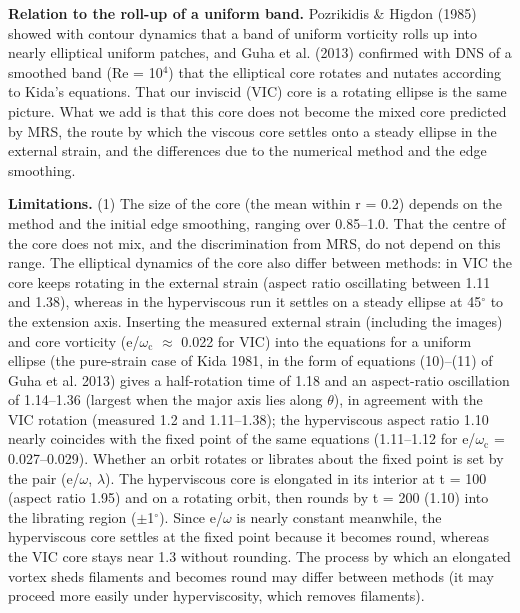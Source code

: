 \documentclass[11pt]{article}
\begin{document}
\textbf{Relation to the roll-up of a uniform band.} Pozrikidis \& Higdon (1985) showed with contour dynamics that a band of uniform vorticity rolls up into nearly elliptical uniform patches, and Guha et al. (2013) confirmed with DNS of a smoothed band (Re = 10$^{4}$) that the elliptical core rotates and nutates according to Kida's equations. That our inviscid (VIC) core is a rotating ellipse is the same picture. What we add is that this core does not become the mixed core predicted by MRS, the route by which the viscous core settles onto a steady ellipse in the external strain, and the differences due to the numerical method and the edge smoothing.

\textbf{Limitations.} (1) The size of the core (the mean within r = 0.2) depends on the method and the initial edge smoothing, ranging over 0.85--1.0. That the centre of the core does not mix, and the discrimination from MRS, do not depend on this range. The elliptical dynamics of the core also differ between methods: in VIC the core keeps rotating in the external strain (aspect ratio oscillating between 1.11 and 1.38), whereas in the hyperviscous run it settles on a steady ellipse at 45$^\circ$ to the extension axis. Inserting the measured external strain (including the images) and core vorticity (e/$\omega{}_{\mathrm{c}}$ $\approx{}$ 0.022 for VIC) into the equations for a uniform ellipse (the pure-strain case of Kida 1981, in the form of equations (10)--(11) of Guha et al. 2013) gives a half-rotation time of 1.18 and an aspect-ratio oscillation of 1.14--1.36 (largest when the major axis lies along $\theta{}$), in agreement with the VIC rotation (measured 1.2 and 1.11--1.38); the hyperviscous aspect ratio 1.10 nearly coincides with the fixed point of the same equations (1.11--1.12 for e/$\omega{}_{\mathrm{c}}$ = 0.027--0.029). Whether an orbit rotates or librates about the fixed point is set by the pair (e/$\omega{}$, $\lambda{}$). The hyperviscous core is elongated in its interior at t = 100 (aspect ratio 1.95) and on a rotating orbit, then rounds by t = 200 (1.10) into the librating region ($\pm{}$1$^\circ$). Since e/$\omega{}$ is nearly constant meanwhile, the hyperviscous core settles at the fixed point because it becomes round, whereas the VIC core stays near 1.3 without rounding. The process by which an elongated vortex sheds filaments and becomes round may differ between methods (it may proceed more easily under hyperviscosity, which removes filaments).
\end{document}
